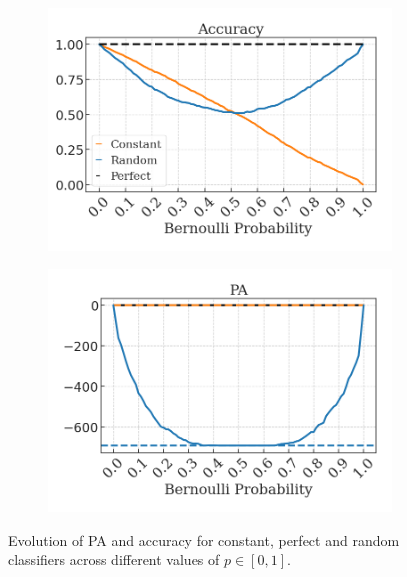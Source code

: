 \begin{frame}
	\begin{figure}[t]
		\centering
		\begin{subfigure}[b]{0.35\textwidth}
			\centering
			\includegraphics[width=\textwidth]{img/experimental_setup/artificial_acc_final.png}
		\end{subfigure}
		\hspace{1em}
		\begin{subfigure}[b]{0.35\textwidth}
			\centering
			\includegraphics[width=\textwidth]{img/experimental_setup/artificial_logPA_final.png}
		\end{subfigure}
		\caption{
		Evolution of PA and accuracy for constant, perfect and random classifiers across different 
		values of $p \in [0,1]$.
		}
		\label{fig:empirical_plot}
	\end{figure}
\end{frame}

